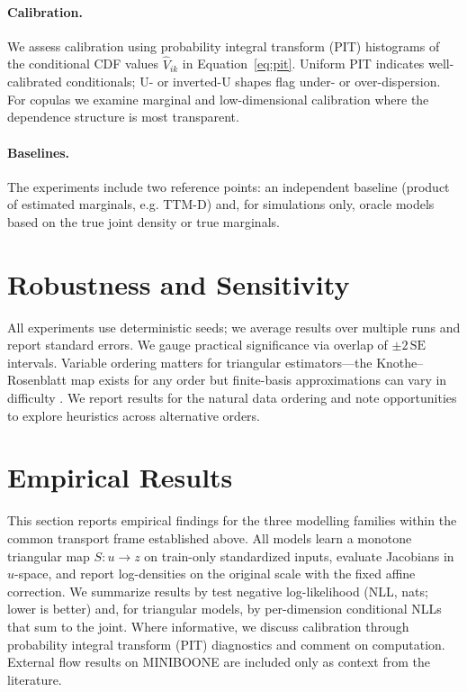 \documentclass[11pt,a4paper,twoside]{book}\usepackage[]{graphicx}\usepackage[]{xcolor}
\begin{document}
\paragraph{Calibration.} We assess calibration using probability integral transform (PIT) histograms of the conditional CDF values $\widehat{V}_{ik}$ in Equation~\eqref{eq:pit}. Uniform PIT indicates well-calibrated conditionals; U- or inverted-U shapes flag under- or over-dispersion. For copulas we examine marginal and low-dimensional calibration where the dependence structure is most transparent.

\paragraph{Baselines.} The experiments include two reference points: an independent baseline (product of estimated marginals, e.g. TTM-D) and, for simulations only, oracle models based on the true joint density or true marginals.

\section{Robustness and Sensitivity}

All experiments use deterministic seeds; we average results over multiple runs and report standard errors. We gauge practical significance via overlap of $\pm 2\,\mathrm{SE}$ intervals. Variable ordering matters for triangular estimators---the Knothe--Rosenblatt map exists for any order but finite-basis approximations can vary in difficulty \citep{ramgraber2025friendly}. We report results for the natural data ordering and note opportunities to explore heuristics across alternative orders.

\section{Empirical Results}

This section reports empirical findings for the three modelling families within the common transport frame established above. All models learn a monotone triangular map $S:u\to z$ on train-only standardized inputs, evaluate Jacobians in $u$-space, and report log-densities on the original scale with the fixed affine correction. We summarize results by test negative log-likelihood (NLL, nats; lower is better) and, for triangular models, by per-dimension conditional NLLs that sum to the joint. Where informative, we discuss calibration through probability integral transform (PIT) diagnostics and comment on computation. External flow results on MINIBOONE are included only as context from the literature.
\end{document}
